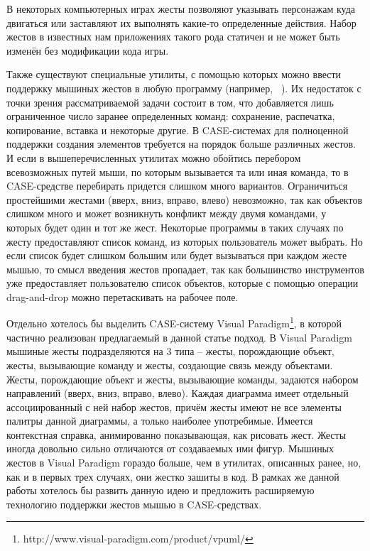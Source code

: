 \documentclass[a5paper]{article}
\begin{document}
В некоторых компьютерных играх жесты позволяют указывать персонажам куда двигаться или заставляют их выполнять какие-то определенные действия. Набор жестов в известных нам приложениях такого рода статичен и не может быть изменён без модификации кода игры.

Также существуют специальные утилиты, с помощью которых можно ввести поддержку мышиных жестов в любую программу  (например, ~\cite{strokeIt, gMote, xstroke, flyGesture}). Их недостаток с точки зрения рассматриваемой задачи состоит в том, что добавляется лишь ограниченное число заранее определенных команд: сохранение, распечатка, копирование, вставка и некоторые другие. В CASE-системах для полноценной поддержки создания элементов требуется на порядок больше различных жестов. И если в вышеперечисленных утилитах можно обойтись перебором всевозможных путей мыши, по которым вызывается та или иная команда, то в CASE-средстве перебирать придется слишком много вариантов. Ограничиться простейшими жестами (вверх, вниз, вправо, влево) невозможно, так как объектов слишком много и может возникнуть конфликт между двумя командами, у которых будет один и тот же жест. Некоторые программы в таких случаях по жесту предоставляют список команд, из которых пользователь может выбрать. Но если список будет слишком большим или будет вызываться при каждом жесте мышью, то смысл введения жестов пропадает, так как большинство инструментов уже предоставляет пользователю список объектов, которые с помощью операции drag-and-drop можно перетаскивать на рабочее поле.

Отдельно хотелось бы выделить CASE-систему Visual Paradigm\footnote{http://www.visual-paradigm.com/product/vpuml/}, в которой частично реализован предлагаемый в данной статье подход. В Visual Paradigm мышиные жесты подразделяются на 3 типа – жесты, порождающие объект, жесты, вызывающие команду и жесты, создающие связь между объектами. Жесты, порождающие объект и жесты, вызывающие команды, задаются набором направлений (вверх, вниз, вправо, влево). Каждая диаграмма имеет отдельный ассоциированный с ней набор жестов, причём жесты имеют не все элементы палитры данной диаграммы, а только наиболее употребимые. Имеется контекстная справка, анимированно показывающая, как рисовать жест. Жесты иногда довольно сильно отличаются от создаваемых ими фигур. Мышиных жестов в Visual Paradigm гораздо больше, чем в  утилитах, описанных ранее, но, как и в первых трех случаях, они жестко зашиты в код. В рамках же данной работы хотелось бы развить данную идею и предложить расширяемую технологию поддержки жестов мышью в CASE-средствах.
\end{document}
